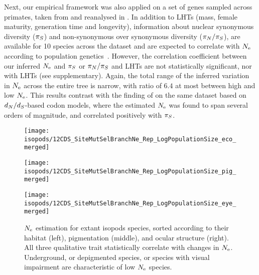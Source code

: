 
Next, our empirical framework was also applied on a set of genes sampled across primates, taken from \citet{Perelman2011} and reanalysed in \citet{Brevet2019}.
In addition to LHTs (mass, female maturity, generation time and longevity), information about nuclear {synonymous} diversity ($\pi_S$) and {non-synonymous} over {synonymous} diversity ($\pi_N / \pi_S$), are available for 10 species across the dataset and are expected to correlate with $\Ne$ according to population genetics~\citep{Eyre-walker2007, Galtier2016}.
However, the correlation coefficient between our inferred $\Ne$ and $\pi_S$ or $\pi_N / \pi_S$ and LHTs are not statistically significant, nor with {LHT}s (see supplementary).
Again, the total range of the inferred variation in $\Ne$ across the entire tree is narrow, with ratio of $6.4$ at most between high and low $\Ne$.
This results contrast with the finding of \citet{Brevet2019} on the same dataset based on $d_N / d_S$-based {codon} models, where the estimated $\Ne$ was found to span several orders of magnitude, and correlated positively with $\pi_S$.


\begin{figure*}[t]
    \centering
    \begin{minipage}{0.32\linewidth}
        \texttt{[image: isopods/12CDS\_SiteMutSelBranchNe\_Rep\_LogPopulationSize\_eco\_merged]}
    \end{minipage} \hfill
    \hfill
    \begin{minipage}{0.32\linewidth}
        \texttt{[image: isopods/12CDS\_SiteMutSelBranchNe\_Rep\_LogPopulationSize\_pig\_merged]}
    \end{minipage} \hfill
    \hfill
    \begin{minipage}{0.32\linewidth}
        \texttt{[image: isopods/12CDS\_SiteMutSelBranchNe\_Rep\_LogPopulationSize\_eye\_merged]}
    \end{minipage}
    \hfill
    \caption[$\Ne$ as a function of traits in isopods]{
        $\Ne$ estimation for extant isopods species, sorted according to their habitat (left), pigmentation (middle), and ocular structure (right).
        All three qualitative trait statistically correlate with changes in $\Ne$.
        Underground, or depigmented species, or species with visual impairment are characteristic of low $\Ne$ species.}
    \label{fig:isopods_correlation}
\end{figure*}



